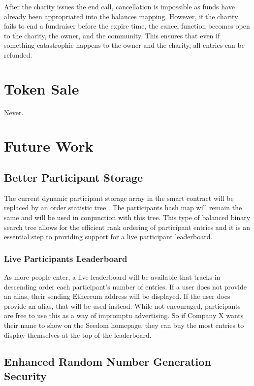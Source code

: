 \documentclass[11pt]{article}
\begin{document}
After the charity issues the end call, cancellation is impossible as funds have already been appropriated into the balances mapping. However, if the charity fails to end a fundraiser before the expire time, the cancel function becomes open to the charity, the owner, and the community. This ensures that even if something catastrophic happens to the owner and the charity, all entries can be refunded.

\section{Token Sale}
Never.

\section{Future Work}

\subsection{Better Participant Storage}

The current dynamic participant storage array in the smart contract will be replaced by an order statistic tree \cite{5}. The participants hash map will remain the same and will be used in conjunction with this tree. This type of balanced binary search tree allows for the efficient rank ordering of participant entries and it is an essential step to providing support for a live participant leaderboard.

\subsubsection{Live Participants Leaderboard}

As more people enter, a live leaderboard will be available that tracks in descending order each participant's number of entries. If a user does not provide an alias, their sending Ethereum address will be displayed. If the user does provide an alias, that will be used instead. While not encouraged, participants are free to use this as a way of impromptu advertising. So if Company X wants their name to show on the Seedom homepage, they can buy the most entries to display themselves at the top of the leaderboard.

\subsection{Enhanced Random Number Generation Security}
\end{document}
